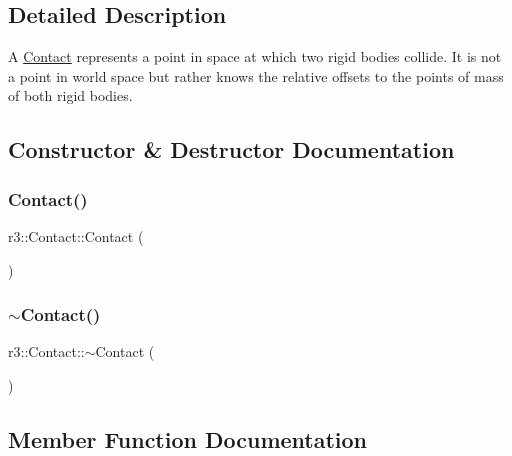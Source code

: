 \subsection{Detailed Description}
A \mbox{\hyperlink{classr3_1_1_contact}{Contact}} represents a point in space at which two rigid bodies collide. It is not a point in world space but rather knows the relative offsets to the points of mass of both rigid bodies. 

\subsection{Constructor \& Destructor Documentation}
\mbox{\label{classr3_1_1_contact_af2648c9a1e37583ac230a40f4fc6b72d}} 
\subsubsection{\texorpdfstring{Contact()}{Contact()}}
{\footnotesize\ttfamily r3\+::\+Contact\+::\+Contact (\begin{DoxyParamCaption}{ }\end{DoxyParamCaption})\hspace{0.3cm}{\ttfamily [explicit]}}

\mbox{\label{classr3_1_1_contact_a011905bfa1cfa3ed459650796b105c6a}} 
\subsubsection{\texorpdfstring{$\sim$\+Contact()}{~Contact()}}
{\footnotesize\ttfamily r3\+::\+Contact\+::$\sim$\+Contact (\begin{DoxyParamCaption}{ }\end{DoxyParamCaption})\hspace{0.3cm}{\ttfamily [default]}}



\subsection{Member Function Documentation}
\mbox{\label{classr3_1_1_contact_a3f2c146006389bf6273cdd078763b7a3}} 
